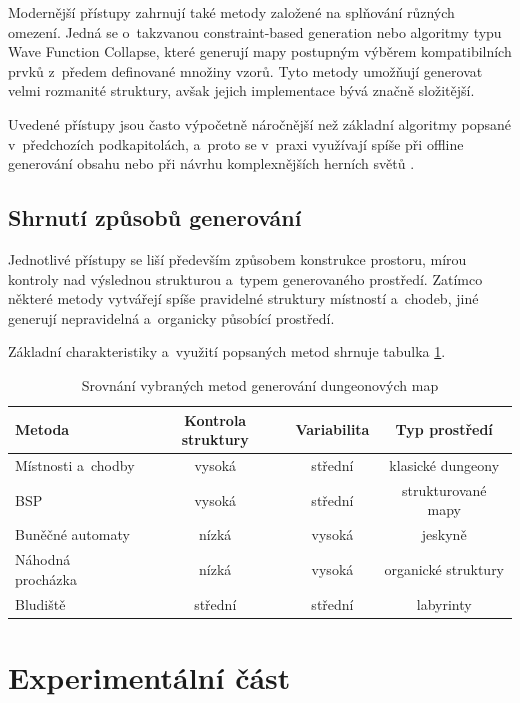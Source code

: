 \documentclass[
   program=itk,
   biblatex,
   figures=true,
   tables=true,
   glossaries,
   index
]{kidiplom}
\begin{document}
Modernější přístupy zahrnují také metody založené na splňování různých omezení. Jedná se o~takzvanou constraint-based generation nebo algoritmy typu Wave Function Collapse, které generují mapy postupným výběrem kompatibilních prvků z~předem definované množiny vzorů. 
Tyto metody umožňují generovat velmi rozmanité struktury, avšak jejich implementace bývá značně složitější.

Uvedené přístupy jsou často výpočetně náročnější než základní algoritmy popsané v~předchozích podkapitolách, a~proto se v~praxi využívají spíše při offline generování obsahu nebo při návrhu komplexnějších herních světů \cite{Linden2014,Shaker2016}.

\subsection{Shrnutí způsobů generování}

Jednotlivé přístupy se liší především způsobem konstrukce prostoru, mírou kontroly nad výslednou strukturou a~typem generovaného prostředí.
Zatímco některé metody vytvářejí spíše pravidelné struktury místností a~chodeb, jiné generují nepravidelná a~organicky působící prostředí.

Základní charakteristiky a~využití popsaných metod shrnuje tabulka \ref{tab:dungeon_methods}.

\begin{table}[H]
\centering
\begin{tabular}{|l|c|c|c|}
\hline
Metoda & Kontrola struktury & Variabilita & Typ prostředí \\ 
\hline
Místnosti a~chodby & vysoká & střední & klasické dungeony \\
BSP & vysoká & střední & strukturované mapy \\
Buněčné automaty & nízká & vysoká & jeskyně \\
Náhodná procházka & nízká & vysoká & organické struktury \\
Bludiště & střední & střední & labyrinty \\
\hline
\end{tabular}
\caption{Srovnání vybraných metod generování dungeonových map}
\label{tab:dungeon_methods}
\end{table}

\section{Experimentální část}
\end{document}
